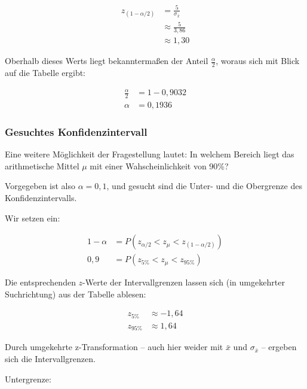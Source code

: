 \documentclass[
  ngerman,
]{article}
\begin{document}
\[\begin{aligned}
z_{(1-\alpha/2)}&=\frac{5}{\sigma_{\bar{x}}}\\[4pt]
&\approx\frac{5}{3,86}\\[4pt]
&\approx1{,}30
\end{aligned}\]

Oberhalb dieses Werts liegt bekanntermaßen der Anteil \(\frac{\alpha}{2}\), woraus sich mit Blick auf die Tabelle ergibt:

\nopagebreak

\[\begin{aligned}
\frac{\alpha}{2}&=1-0,9032\\[4pt]
\alpha&=0,1936
\end{aligned}\]

\hypertarget{gesuchtes-konfidenzintervall}{%
\subsubsection{Gesuchtes Konfidenzintervall}\label{gesuchtes-konfidenzintervall}}

Eine weitere Möglichkeit der Fragestellung lautet: In welchem Bereich liegt das arithmetische Mittel \(\mu\) mit einer Wahscheinlichkeit von 90\%?

Vorgegeben ist also \(\alpha=0{,}1\), und gesucht sind die Unter- und die Obergrenze des Konfidenzintervalls.

Wir setzen ein:

\nopagebreak

\[\begin{aligned}
1-\alpha&=P(z_{\alpha/2} < z_{\mu} < z_{(1-\alpha/2)})\\[4pt]
0{,}9 &= P(z_{5\%} < z_{\mu} < z_{95\%})
\end{aligned}\]

Die entsprechenden \(z\)-Werte der Intervallgrenzen lassen sich (in umgekehrter Suchrichtung) aus der Tabelle ablesen:

\nopagebreak

\[\begin{aligned}
z_{5\%}&\approx-1{,}64\\[4pt]
z_{95\%}&\approx 1{,}64
\end{aligned}\]

Durch umgekehrte z-Transformation -- auch hier weider mit \(\bar{x}\) und \(\sigma_{\bar{x}}\) -- ergeben sich die Intervallgrenzen.

Untergrenze:

\nopagebreak
\end{document}
